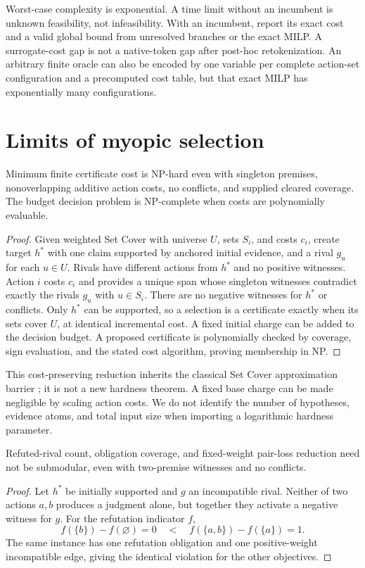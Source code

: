 Worst-case complexity is exponential. A time limit without an incumbent is
unknown feasibility, not infeasibility. With an incumbent, report its exact
cost and a valid global bound from unresolved branches or the exact MILP.
A surrogate-cost gap is not a native-token gap after post-hoc retokenization.
An arbitrary finite oracle can also be encoded by one variable per complete
action-set configuration and a precomputed cost table, but that exact MILP
has exponentially many configurations.

\section{Limits of myopic selection}
\label{sec:alg-limits}

\begin{proposition}
Minimum finite certificate cost is NP-hard even with singleton premises,
nonoverlapping additive action costs, no conflicts, and supplied cleared
coverage. The budget decision problem is NP-complete when costs are
polynomially evaluable.
\end{proposition}
\begin{proof}
Given weighted Set Cover with universe $U$, sets $S_i$, and costs $c_i$,
create target $h^*$ with one claim supported by anchored initial evidence,
and a rival $g_u$ for each $u\in U$. Rivals have different actions from
$h^*$ and no positive witnesses. Action $i$ costs $c_i$ and provides a unique
span whose singleton witnesses contradict exactly the rivals $g_u$ with
$u\in S_i$. There are no negative witnesses for $h^*$ or conflicts. Only
$h^*$ can be supported, so a selection is a certificate exactly when its
sets cover $U$, at identical incremental cost. A fixed initial charge can be
added to the decision budget. A proposed certificate is polynomially checked
by coverage, sign evaluation, and the stated cost algorithm, proving membership
in NP.
\end{proof}

This cost-preserving reduction inherits the classical Set Cover
approximation barrier \citep{dinur2014parallel}; it is not a new hardness
theorem. A fixed base charge can be made negligible by scaling action
costs. We do not identify the number of hypotheses, evidence atoms, and
total input size when importing a logarithmic hardness parameter.

\begin{proposition}
Refuted-rival count, obligation coverage, and fixed-weight pair-loss reduction
need not be submodular, even with two-premise witnesses and no conflicts.
\end{proposition}
\begin{proof}
Let $h^*$ be initially supported and $g$ an incompatible rival. Neither of
two actions $a,b$ produces a judgment alone, but together they activate a
negative witness for $g$. For the refutation indicator $f$,
\[
 f(\{b\})-f(\varnothing)=0
 \quad<\quad f(\{a,b\})-f(\{a\})=1.
\]
The same instance has one refutation obligation and one positive-weight
incompatible edge, giving the identical violation for the other objectives.
\end{proof}


